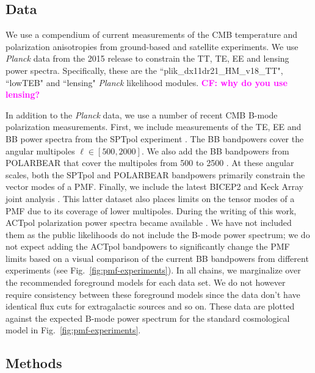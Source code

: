 \documentclass[apj]{emulateapj}
\newcommand{\planck}{{\sl Planck}}
\newcommand{\pb}{POLARBEAR}
\newcommand{\sptpol}{SPTpol}
\begin{document}
\subsection{Data}

We use a compendium of current measurements of the CMB temperature and polarization anisotropies from ground-based and satellite experiments. 
We use \planck{} data from the 2015 release to constrain the TT, TE, EE and lensing power spectra. 
Specifically, these are the ``plik\_dx11dr21\_HM\_v18\_TT", ``lowTEB" and ``lensing" \planck{} likelihood modules. \textbf{\textcolor{magenta}{CF: why do you use lensing?}}


In addition to the \planck{} data, we use a number of recent CMB B-mode polarization measurements. 
First, we include measurements of the TE, EE and BB power spectra from the \sptpol{} experiment \citep{crites15,keisler15}. 
The BB bandpowers cover the angular multipoles $\ell \in [500,2000]$. 
We also add the BB bandpowers from \pb{} that cover the multipoles from 500 to 2500 \citep{polarbear15}. 
At these angular scales, both the \sptpol{} and \pb{} bandpowers primarily constrain the vector modes of a PMF. 
Finally, we include the latest BICEP2 and Keck Array  joint analysis \citep{bicepkeck15}. 
This latter dataset also places limits on the tensor modes of a PMF due to its coverage of lower multipoles. 
During the writing of this work, ACTpol polarization power spectra became available \citep{naess14,louis16}. 
We have not included them as the public likelihoods do not include the B-mode power spectrum; we do not expect adding the ACTpol bandpowers to significantly change the PMF limits based on a visual comparison of the current BB bandpowers from different experiments (see Fig.~\ref{fig:pmf-experiments}).
In all chains, we marginalize over the recommended foreground models for each data set. 
We do not however require consistency between these foreground models since the data don't have identical flux cuts for extragalactic sources and so on. 
These data are plotted against the expected B-mode power spectrum for the standard cosmological model in Fig.~\ref{fig:pmf-experiments}. 

\subsection{Methods}
\end{document}
